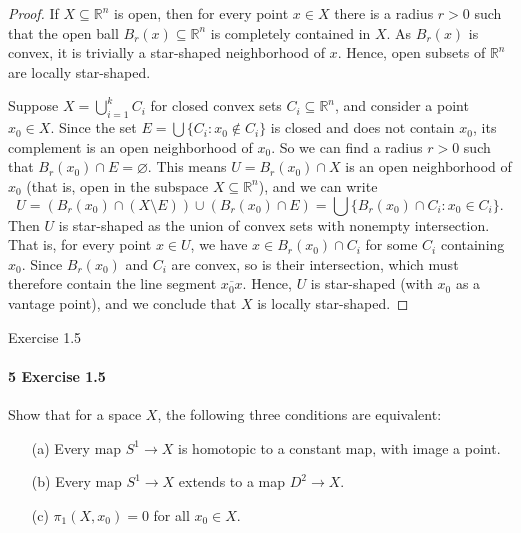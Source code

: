 \documentclass[12pt]{article}
\newlength{\myparskip}
\newenvironment{fullbox}{\begin{lrbox}{\savefullbox}\begin{minipage}{\dimexpr\textwidth-2\fboxsep\relax}\setlength{\parskip}{\myparskip}}{\end{minipage}\end{lrbox}\framebox[\textwidth]{\usebox{\savefullbox}}}
\newenvironment{pbox}[1][]{\begin{fullbox}\ifx#1\empty\else\paragraph{#1}\phantom{}\fi}{\end{fullbox}}
\theoremstyle{definition}
\newcommand{\R}{\mathbb{R}}
\renewcommand{\emptyset}{\varnothing}
\newcommand{\<}{\langle}
\renewcommand{\>}{\rangle}
\newcommand{\seq}{\subseteq}
\begin{document}
\begin{proof}
    If $X \seq \R^n$ is open, then for every point $x \in X$ there is a radius $r > 0$ such that the open ball $B_r(x) \seq \R^n$ is completely contained in $X$.
    As $B_r(x)$ is convex, it is trivially a star-shaped neighborhood of $x$.
    Hence, open subsets of $\R^n$ are locally star-shaped.

    Suppose $X = \bigcup_{i=1}^{k} C_i$ for closed convex sets $C_i \seq \R^n$, and consider a point $x_0 \in X$.
    Since the set $E = \bigcup\{C_i : x_0 \notin C_i\}$ is closed and does not contain $x_0$, its complement is an open neighborhood of $x_0$.
    So we can find a radius $r > 0$ such that $B_r(x_0) \cap E = \emptyset$.
    This means $U = B_r(x_0) \cap X$ is an open neighborhood of $x_0$ (that is, open in the subspace $X \seq \R^n$), and we can write
    \[
        U = (B_r(x_0) \cap (X \setminus E)) \cup (B_r(x_0) \cap E)= \bigcup\{B_r(x_0) \cap C_i : x_0 \in C_i\}.
    \]
    Then $U$ is star-shaped as the union of convex sets with nonempty intersection.
    That is, for every point $x \in U$, we have $x \in B_r(x_0) \cap C_i$ for some $C_i$ containing $x_0$.
    Since $B_r(x_0)$ and $C_i$ are convex, so is their intersection, which must therefore contain the line segment $\overline{x_0x}$.
    Hence, $U$ is star-shaped (with $x_0$ as a vantage point), and we conclude that $X$ is locally star-shaped.
\end{proof}

\newpage
\begin{pbox}[5 Exercise 1.5]
    Show that for a space $X$, the following three conditions are equivalent:
    \begin{enumerate}
        \item[(a)] Every map $S^1 \to X$ is homotopic to a constant map, with image a point.
        \item[(b)] Every map $S^1 \to X$ extends to a map $D^2 \to X$.
        \item[(c)] $\pi_1(X, x_0) = 0$ for all $x_0 \in X$.
    \end{enumerate}
\end{pbox}
\end{document}
